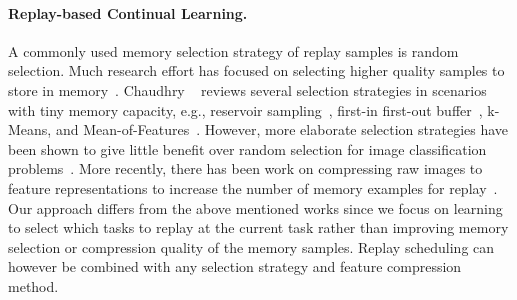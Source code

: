 \vspace{-3mm}
\paragraph{Replay-based Continual Learning.} A commonly used memory selection strategy of replay samples is random selection. 
Much research effort has focused on selecting higher quality samples to store in memory~. Chaudhry \etal~ reviews several selection strategies in scenarios with tiny memory capacity, e.g., reservoir sampling~, first-in first-out buffer~, k-Means, and Mean-of-Features~. However, more elaborate selection strategies have been shown to give little benefit over random selection for image classification problems~. More recently, there has been work on compressing raw images to feature representations to increase the number of memory examples for replay~. 
Our approach differs from the above mentioned works since we focus on learning to select which tasks to replay at the current task rather than improving memory selection or compression quality of the memory samples. %
Replay scheduling can however be combined with any selection strategy and feature compression method. %



